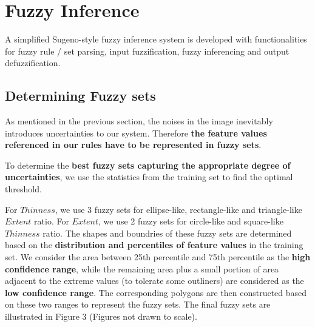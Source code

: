 \section{Fuzzy Inference}

A simplified Sugeno-style fuzzy inference system is developed with functionalities for fuzzy rule / set parsing, input fuzzification, fuzzy inferencing and output defuzzification.

\subsection{Determining Fuzzy sets}

As mentioned in the previous section, the noises in the image inevitably introduces uncertainties to our system. Therefore \textbf{the feature values referenced in our rules have to be represented in fuzzy sets}.

To determine the \textbf{best fuzzy sets capturing the appropriate degree of uncertainties}, we use the statistics from the training set to find the optimal threshold.

For $Thinness$, we use 3 fuzzy sets for ellipse-like, rectangle-like and triangle-like $Extent$ ratio. For $Extent$, we use 2 fuzzy sets for circle-like and square-like $Thinness$ ratio. The shapes and boundries of these fuzzy sets are determined based on the \textbf{distribution and percentiles of feature values} in the training set. We consider the area between 25th percentile and 75th percentile as the \textbf{high confidence range}, while the remaining area plus a small portion of area adjacent to the extreme values (to tolerate some outliners) are considered as the \textbf{low confidence range}. The corresponding polygons are then constructed based on these two ranges to represent the fuzzy sets. The final fuzzy sets are illustrated in Figure 3 (Figures not drawn to scale).


